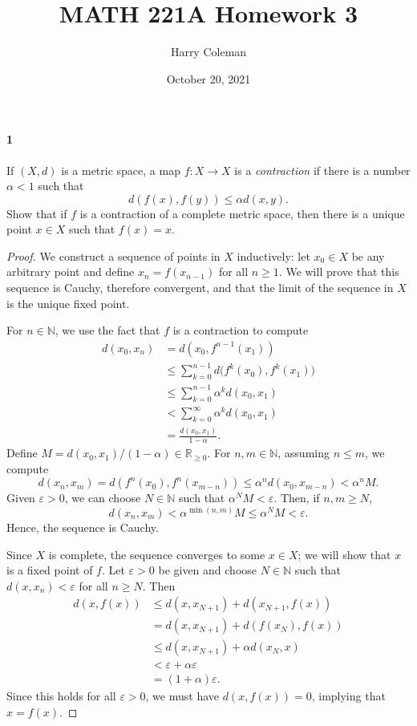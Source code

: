 \documentclass[12pt]{article}
\renewcommand{\maketitle}{\thispagestyle{title}}
\newlength{\myparskip}
\newenvironment{fullbox}{\begin{lrbox}{\savefullbox}\begin{minipage}{\dimexpr\textwidth-2\fboxsep\relax}\setlength{\parskip}{\myparskip}}{\end{minipage}\end{lrbox}\framebox[\textwidth]{\usebox{\savefullbox}}}
\newenvironment{pbox}[1][]{\begin{fullbox}\ifx#1\empty\else\paragraph{#1}\fi}{\end{fullbox}}
\newcommand{\N}{\mathbb{N}}
\newcommand{\R}{\mathbb{R}}
\newcommand{\eps}{\varepsilon}
\newcommand{\<}{\langle}
\renewcommand{\>}{\rangle}
\begin{document}
\title{MATH 221A Homework 3}
\author{Harry Coleman}
\date{October 20, 2021}
\maketitle

\begin{pbox}[1]
    If $(X,d)$ is a metric space, a map $f:X \to X$ is a \emph{contraction} if there is a number $\alpha<1$ such that
  \[d(f(x),f(y)) \leq \alpha d(x,y).\]
  Show that if $f$ is a contraction of a complete metric space, then there is a unique point $x \in X$ such that $f(x)=x$.
\end{pbox}

\begin{proof}
    We construct a sequence of points in $X$ inductively: let $x_0 \in X$ be any arbitrary point and define $x_n = f(x_{n-1})$ for all $n \geq 1$. We will prove that this sequence is Cauchy, therefore convergent, and that the limit of the sequence in $X$ is the unique fixed point.

    For $n \in \N$, we use the fact that $f$ is a contraction to compute
    \begin{align*}
        d(x_0, x_n)
            &= d(x_0, f^{n-1}(x_1)) \\
            &\leq \sum_{k=0}^{n-1} d\big(f^k(x_0), f^k(x_1)\big) \\
            &\leq \sum_{k=0}^{n-1} \alpha^k d(x_0, x_1) \\
            &< \sum_{k=0}^{\infty} \alpha^k d(x_0, x_1) \\
            &= \frac{d(x_0, x_1)}{1 - \alpha}.
    \end{align*}
    Define $M = d(x_0, x_1)/(1 - \alpha) \in \R_{\geq0}$. For $n, m \in \N$, assuming $n \leq m$, we compute
    \[
        d(x_n, x_m)
            = d(f^n(x_0), f^n(x_{m-n}))
            \leq \alpha^n d(x_0, x_{m-n})
            < \alpha^nM.
    \]
    Given $\eps > 0$, we can choose $N \in \N$ such that $\alpha^NM < \eps$. Then, if $n, m \geq N$,
    \[
        d(x_n, x_m)
            < \alpha^{\min(n, m)}M
            \leq \alpha^NM
            < \eps.
    \]
    Hence, the sequence is Cauchy.
    
    Since $X$ is complete, the sequence converges to some $x \in X$; we will show that $x$ is a fixed point of $f$. Let $\eps > 0$ be given and choose $N \in \N$ such that $d(x, x_n) < \eps$ for all $n \geq N$. Then
    \begin{align*}
        d(x, f(x))
            &\leq d(x, x_{N+1}) + d(x_{N+1}, f(x)) \\
            &= d(x, x_{N+1}) + d(f(x_N), f(x)) \\
            &\leq d(x, x_{N+1}) + \alpha d(x_N, x) \\
            &< \eps + \alpha \eps \\
            &= (1 + \alpha)\eps.
    \end{align*}
    Since this holds for all $\eps > 0$, we must have $d(x, f(x)) = 0$, implying that $x = f(x)$.


\end{proof}
\end{document}
